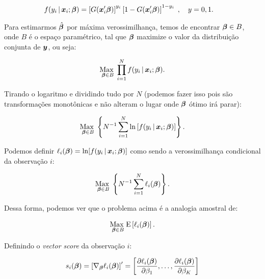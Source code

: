 \documentclass[11pt, oneside, a4paper, article]{article}
\numberwithin{equation}{section}
\begin{document}
\begin{description}
\vspace{-1 em}
\begin{align*}
f( y_{i} \, | \, \boldsymbol{x}_{i} ; \boldsymbol{\beta} ) 
&= 
\left[ G(\boldsymbol{x}_{i}' \boldsymbol{\beta} )  \right]^{y_{i}}
\left[ 1 - G(\boldsymbol{x}_{i}' \boldsymbol{\beta} )  \right]^{1 - y_{i}}
\; , \quad y=0,1.
\end{align*}

Para estimarmos $\hat{\boldsymbol{\beta}}$ por máxima verossimilhança, temos de encontrar $\boldsymbol{\beta} \in B$, onde $B$ é o espaço paramétrico, tal que $\boldsymbol{\beta}$ maximize o valor da distribuição conjunta de $\boldsymbol{y}$, ou seja:

\vspace{-1 em}
\begin{align*}
	\underset{\boldsymbol{\beta} \in B}{\text{Max }} 
	\prod_{i=1}^{N}
	f( y_{i} \, | \, \boldsymbol{x}_{i} ; \boldsymbol{\beta} ).
\end{align*}

\noindent

Tirando o logaritmo e dividindo tudo por $N$ (podemos fazer isso pois são transformações monotônicas e não alteram o lugar onde $\boldsymbol{\beta}$ ótimo irá parar):

\vspace{-1 em}
\begin{align*}
\underset{\boldsymbol{\beta} \in B}{\text{Max }} 
\left\{ 
N^{-1} \sum_{i=1}^{N}
\ln \left[ f( y_{i} \, | \, \boldsymbol{x}_{i} ; \boldsymbol{\beta} ) \right]
\right\}.
\end{align*}

\noindent
Podemos definir
$\ell_{i}( \boldsymbol{\beta} ) = \ln[ f( y_{i} \, | \, \boldsymbol{x}_{i} ; \boldsymbol{\beta} ) ]$
como sendo a verossimilhança condicional da observação $i$:

\vspace{-1 em}
\begin{align*}
\underset{\boldsymbol{\beta} \in B}{\text{Max }} 
\left\{ 
N^{-1} \sum_{i=1}^{N} \ell_{i} (\boldsymbol{\beta})
\right\}.
\end{align*}

Dessa forma, podemos ver que o problema acima é a analogia amostral de:

\vspace{-1 em}
\begin{align*}
\underset{\boldsymbol{\beta} \in B}{\text{Max }} 
\text{E} \left[ 
\ell_{i} ( \boldsymbol{\beta} )
\right].
\end{align*}

Definindo o \textit{vector score} da observação $i$:

\vspace{-1 em}
\begin{align*}
s_{i} (\boldsymbol{\beta}) = 
\left[ \nabla_{\boldsymbol{\beta}} \ell_{i} (\boldsymbol{\beta}) \right]'
=
\begin{bmatrix}
	\dfrac{\partial{\ell_{i} (\ensuremath{\boldsymbol{\beta}})}}{\partial{\beta_{1}}},
	\dots,
	\dfrac{\partial{\ell_{i} (\ensuremath{\boldsymbol{\beta}})}}{\partial{\beta_{K}}}
\end{bmatrix}
\end{align*}


\end{description}
\end{document}

